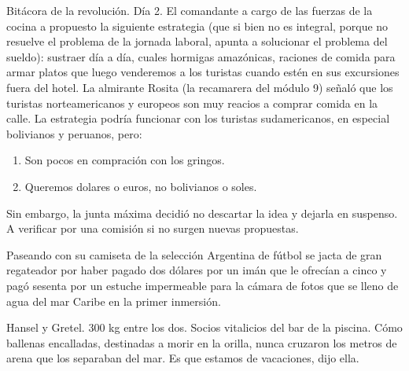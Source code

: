 \documentclass[12pt,twoside,openright,a5paper]{book}
\begin{document}
Bitácora de la revolución. Día 2. El comandante a cargo de las fuerzas de
la cocina a propuesto la siguiente estrategia (que si bien no es integral,
porque no resuelve el problema de la jornada laboral, apunta a solucionar
el problema del sueldo): sustraer día a día, cuales hormigas amazónicas,
raciones de comida para armar platos que luego venderemos a los turistas
cuando estén en sus excursiones fuera del hotel. La almirante Rosita
(la recamarera del módulo 9) señaló que los turistas norteamericanos
y europeos son muy reacios a comprar comida en la calle. La estrategia
podría funcionar con los turistas sudamericanos, en especial bolivianos
y peruanos, pero:

\begin{enumerate}
\item Son pocos en compración con los gringos.
\item Queremos dolares o euros, no bolivianos o soles.
\end{enumerate}

Sin embargo, la junta máxima decidió no descartar la idea y dejarla en
suspenso. A verificar por una comisión si no surgen nuevas propuestas.


\vspace{0.5cm}
\hrulefill\hspace{0.2cm} \decofourleft\decofourright \hspace{0.2cm} \hrulefill
\vspace{0.5cm}

Paseando con su camiseta de la selección Argentina de fútbol se jacta de
gran regateador por haber pagado dos dólares por un imán que le ofrecían
a cinco y pagó sesenta por un estuche impermeable para la cámara de fotos
que se lleno de agua del mar Caribe en la primer inmersión.


\vspace{0.5cm}
\hrulefill\hspace{0.2cm} \decofourleft\decofourright \hspace{0.2cm} \hrulefill
\vspace{0.5cm}

Hansel y Gretel. 300 kg entre los dos. Socios vitalicios del bar de la
piscina. Cómo ballenas encalladas, destinadas a morir en la orilla, nunca
cruzaron los metros de arena que los separaban del mar. Es que estamos de
vacaciones, dijo ella.


\vspace{0.5cm}
\hrulefill\hspace{0.2cm} \decofourleft\decofourright \hspace{0.2cm} \hrulefill
\vspace{0.5cm}
\end{document}
